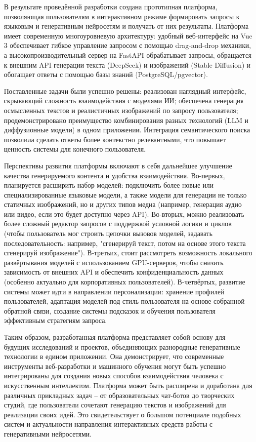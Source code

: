 В результате проведённой разработки создана прототипная платформа, позволяющая пользователям в интерактивном режиме формировать запросы к языковым и генеративным нейросетям и получать от них результаты. Платформа имеет современную многоуровневую архитектуру: удобный веб-интерфейс на Vue 3 обеспечивает гибкое управление запросом с помощью drag-and-drop механики, а высокопроизводительный сервер на FastAPI обрабатывает запросы, обращается к внешним API генерации текста (DeepSeek) и изображений (Stable Diffusion) и обогащает ответы с помощью базы знаний (PostgreSQL/pgvector).

Поставленные задачи были успешно решены: реализован наглядный интерфейс, скрывающий сложность взаимодействия с моделями ИИ; обеспечена генерация осмысленных текстов и реалистичных изображений по запросу пользователя; продемонстрировано преимущество комбинирования разных технологий (LLM и диффузионные модели) в одном приложении. Интеграция семантического поиска позволила сделать ответы более контекстно релевантными, что повышает ценность системы для конечного пользователя.

Перспективы развития платформы включают в себя дальнейшее улучшение качества генерируемого контента и удобства взаимодействия. Во-первых, планируется расширить набор моделей: подключить более новые или специализированные языковые модели, а также модели для генерации не только статичных изображений, но и других типов медиа (например, генерация аудио или видео, если это будет доступно через API). Во-вторых, можно реализовать более сложный редактор запросов с поддержкой условной логики и циклов (чтобы пользователь мог строить цепочки вызовов моделей, задавать последовательность: например, "сгенерируй текст, потом на основе этого текста сгенерируй изображение"). В-третьих, стоит рассмотреть возможность локального развёртывания моделей с использованием GPU-серверов, чтобы снизить зависимость от внешних API и обеспечить конфиденциальность данных (особенно актуально для корпоративных пользователей). В-четвёртых, развитие системы может идти в направлении персонализации: хранение профилей пользователей, адаптация моделей под стиль пользователя на основе собранной обратной связи, создание системы подсказок и обучения пользователя эффективным стратегиям запроса.

Таким образом, разработанная платформа представляет собой основу для будущих исследований и проектов, объединяющих разнородные генеративные технологии в едином приложении. Она демонстрирует, что современные инструменты веб-разработки и машинного обучения могут быть успешно интегрированы для создания новых способов взаимодействия человека с искусственным интеллектом. Платформа может быть расширена и доработана для различных прикладных задач -- от образовательных чат-ботов до творческих студий, где пользователи сочетают генерацию текстов и изображений для реализации своих идей. Это свидетельствует о большом потенциале подобных систем и актуальности направления интерактивных средств работы с генеративными нейросетями.